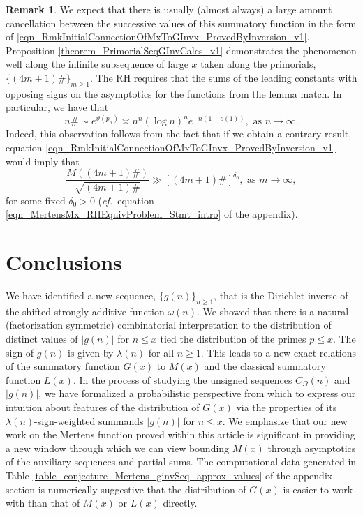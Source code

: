 \documentclass[11pt,reqno,a4letter]{article}
\newcommand{\hlocalref}[1]{\hyperref[#1]{\ref{#1}}}
\numberwithin{equation}{section}
\numberwithin{figure}{section}
\numberwithin{table}{section}
\newcommand{\cf}{\textit{cf.\ }}
\theoremstyle{plain}
\numberwithin{theorem}{section}
\theoremstyle{definition}
\newtheorem{remark}[theorem]{Remark}
\begin{document}
\begin{remark}
We expect that there is usually (almost always) 
a large amount cancellation between the successive 
values of this summatory function in the form of 
\eqref{eqn_RmkInitialConnectionOfMxToGInvx_ProvedByInversion_v1}. 
Proposition \hlocalref{theorem_PrimorialSeqGInvCalcs_v1} 
demonstrates the phenomenon well along the infinite 
subsequence of large $x$ taken along the primorials, $\{(4m+1)\#\}_{m \geq 1}$.  
The RH requires that the sums of the leading constants with opposing signs 
on the asymptotics for the functions from the lemma match. 
In particular, we have that 
\cite{DUSART-1999,DUSART-2010} 
\[
n\# \sim e^{\vartheta(p_n)} \asymp n^n (\log n)^n e^{-n(1+o(1))}, 
     \text{ as } n \rightarrow \infty. 
\]
Indeed, this observation follows from the fact that if we obtain a contrary result, 
equation \eqref{eqn_RmkInitialConnectionOfMxToGInvx_ProvedByInversion_v1} would imply that 
\[
\frac{M((4m+1)\#)}{\sqrt{(4m+1)\#}} \gg \left[(4m+1)\#\right]^{\delta_0}, 
     \text{ as } m \rightarrow \infty, 
\]
for some fixed $\delta_0 > 0$ 
(\cf equation \eqref{eqn_MertensMx_RHEquivProblem_Stmt_intro} of the appendix).
\end{remark}

\section{Conclusions}

We have identified a new sequence, 
$\{g(n)\}_{n \geq 1}$, that is the Dirichlet inverse of the 
shifted strongly additive function $\omega(n)$. 
We showed that there is a natural (factorization symmetric) 
combinatorial interpretation to the distribution of distinct values 
of $|g(n)|$ for $n \leq x$ tied the distribution of the primes $p \leq x$. 
The sign of $g(n)$ is given by $\lambda(n)$ for all $n \geq 1$. 
This leads to a new exact relations of the 
summatory function $G(x)$ to $M(x)$ and the classical summatory function $L(x)$. 
In the process of studying the unsigned sequences $C_{\Omega}(n)$ and $|g(n)|$, 
we have formalized a probabilistic perspective from which to express 
our intuition about features of the distribution of $G(x)$ 
via the properties of its $\lambda(n)$-sign-weighted summands $|g(n)|$ for $n \leq x$.
We emphasize that our new work on the Mertens function proved within this article 
is significant in providing a new window through which we can view bounding $M(x)$ 
through asymptotics of the auxiliary sequences and partial sums. 
The computational data generated in 
Table \hlocalref{table_conjecture_Mertens_ginvSeq_approx_values} of the appendix section 
is numerically suggestive that the distribution of $G(x)$ is easier to work with 
than that of $M(x)$ or $L(x)$ directly. 
\end{document}
